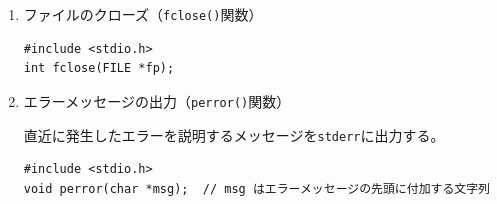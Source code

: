 \documentclass[a4j,dvipdfmx]{jarticle}
\begin{document}
\begin{enumerate}
\begin{enumerate}
\begin{multicols}{2}
\begin{lstlisting}[numbers=none]
例：ファイルから１行読む
FILE *fp = fopen("a.txt", "r");
char buf[100];
fgets(buf, 100, fp);
\end{lstlisting}
\columnbreak

左の例は、{\tt a.txt}ファイルの最初の１行を{\tt buf}に入力する。
{\tt buf}の最後には、\verb/"\n\0"/が格納される。
\end{multicols}

\item １行出力（{\tt fputs()}関数 --- {\tt puts()}のファイル版 ---）
\begin{multicols}{2}
\begin{lstlisting}[numbers=none]
#include <stdio.h>
int fputs(char *buf, FILE *fp);
// エラー時に EOF を返す
// bufは'\0'で終わる文字列
\end{lstlisting}
\columnbreak

\begin{lstlisting}[numbers=none]
例：ファイルに文字列「abc\n」を書き込む
FILE *fp = fopen("a.txt", "w");
fputs("abc\n", fp);
\end{lstlisting}
\end{multicols}

\item 書式付き出力（{\tt fprintf()}関数 --- {\tt printf()}のファイル版 --- ）
\begin{multicols}{2}
\begin{lstlisting}[numbers=none]
#include <stdio.h>
int fprintf(FILE *fp,
            char *format, ...);
\end{lstlisting}
\columnbreak

\begin{lstlisting}[numbers=none]
例：ファイルにデータを書き込む
FILE *fp = fopen("a.txt", "w");
fprintf(fp, "%d,%d\n", x, y);
\end{lstlisting}
\end{multicols}
\end{enumerate}

\item ファイルのクローズ（{\tt fclose()}関数）
\begin{lstlisting}[numbers=none]
#include <stdio.h>
int fclose(FILE *fp);
\end{lstlisting}

\item エラーメッセージの出力（{\tt perror()}関数）

直近に発生したエラーを説明するメッセージを{\tt stderr}に出力する。
\begin{lstlisting}[numbers=none]
#include <stdio.h>
void perror(char *msg);  // msg はエラーメッセージの先頭に付加する文字列


\end{lstlisting}
\end{enumerate}
\end{document}
